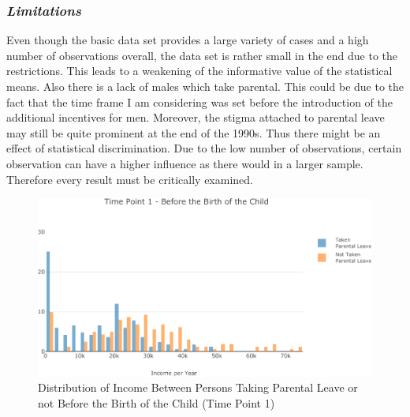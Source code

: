 \documentclass[
  12pt,
]{article}
\begin{document}
\hypertarget{limitations}{%
\subsubsection*{\texorpdfstring{\emph{Limitations}}{Limitations}}\label{limitations}}

Even though the basic data set provides a large variety of cases and a high number of observations overall, the data set is rather small in the end due to the restrictions. This leads to a weakening of the informative value of the statistical means. Also there is a lack of males which take parental. This could be due to the fact that the time frame I am considering was set before the introduction of the additional incentives for men. Moreover, the stigma attached to parental leave may still be quite prominent at the end of the 1990s.
Thus there might be an effect of statistical discrimination.
Due to the low number of observations, certain observation can have a higher influence as there would in a larger sample. Therefore every result must be critically examined.

\begin{figure}

{\centering \includegraphics{Parental_Leave-Finalizing-Data-Set_files/figure-latex/fig-1-1} 

}

\caption{Distribution of Income Between Persons Taking Parental Leave or not Before the Birth of the Child (Time Point 1)}\label{fig:fig-1}
\end{figure}
\end{document}
